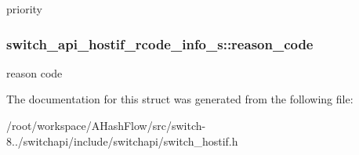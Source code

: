 priority \hypertarget{structswitch__api__hostif__rcode__info__s_a44c2a1b2bfb2f72f409055ee01e3fcf8}{
\subsubsection[{reason\+\_\+code}]{ switch\+\_\+api\+\_\+hostif\+\_\+rcode\+\_\+info\+\_\+s\+::reason\+\_\+code}}\label{structswitch__api__hostif__rcode__info__s_a44c2a1b2bfb2f72f409055ee01e3fcf8}
reason code 

The documentation for this struct was generated from the following file\+:\begin{DoxyCompactItemize}
\item 
/root/workspace/\+A\+Hash\+Flow/src/switch-\/8../switchapi/include/switchapi/switch\+\_\+hostif.\+h\end{DoxyCompactItemize}
